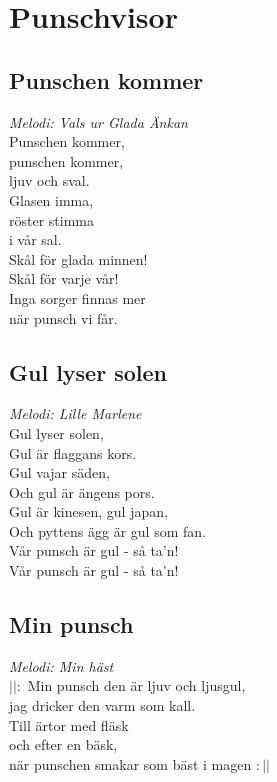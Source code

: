 \chapter{Punschvisor}
\section{Punschen kommer}
\textit{Melodi: Vals ur Glada Änkan}
\vspace{2mm}\\
Punschen kommer,\\
punschen kommer,\\
ljuv och sval.\\
Glasen imma,\\
röster stimma\\
i vår sal.\\
Skål för glada minnen!\\
Skål för varje vår!\\
Inga sorger finnas mer\\
när punsch vi får.

\section{Gul lyser solen}
\textit{Melodi: Lille Marlene }
\vspace{2mm}\\
Gul lyser solen,\\
Gul är flaggans kors.\\
Gul vajar säden,\\
Och gul är ängens pors.\\
Gul är kinesen, gul japan,\\
Och pyttens ägg är gul som fan.\\
Vår punsch är gul - så ta'n!\\
Vår punsch är gul - så ta'n!

\section{Min punsch}
\textit{Melodi: Min häst}
\vspace{2mm}\\
$||:$ Min punsch den är ljuv och ljusgul,\\
jag dricker den varm som kall.\\
Till ärtor med fläsk\\
och efter en bäsk,\\
när punschen smakar som bäst i magen $:||$

